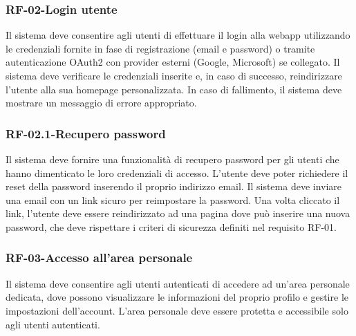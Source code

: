 \subsubsection*{RF-02-Login utente}
Il sistema deve consentire agli utenti di effettuare il login alla webapp utilizzando le credenziali fornite in fase di registrazione (email e password) o tramite autenticazione OAuth2 con provider esterni (Google, Microsoft) se collegato. Il sistema deve verificare le credenziali inserite e, in caso di successo, reindirizzare l'utente alla sua homepage personalizzata. In caso di fallimento, il sistema deve mostrare un messaggio di errore appropriato.
\subsubsection*{RF-02.1-Recupero password}
Il sistema deve fornire una funzionalità di recupero password per gli utenti che hanno dimenticato le loro credenziali di accesso. L'utente deve poter richiedere il reset della password inserendo il proprio indirizzo email. Il sistema deve inviare una email con un link sicuro per reimpostare la password. Una volta cliccato il link, l'utente deve essere reindirizzato ad una pagina dove può inserire una nuova password, che deve rispettare i criteri di sicurezza definiti nel requisito RF-01.
\subsubsection*{RF-03-Accesso all'area personale}
Il sistema deve consentire agli utenti autenticati di accedere ad un'area personale dedicata, dove possono visualizzare le informazioni del proprio profilo e gestire le impostazioni dell'account. L'area personale deve essere protetta e accessibile solo agli utenti autenticati.

